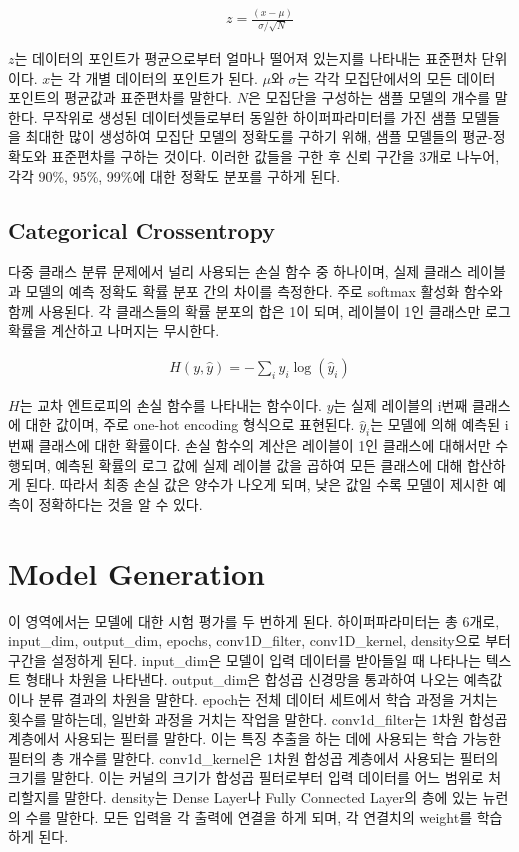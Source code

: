 \documentclass{jcse}
\begin{document}
\begin{eqnarray}
z = \frac{(x - \mu)}{\sigma / \sqrt{N}}
\end{eqnarray}

${z}$는 데이터의 포인트가 평균으로부터 얼마나 떨어져 있는지를 나타내는 표준편차 단위이다.
${x}$는 각 개별 데이터의 포인트가 된다.
$\mu$와 $\sigma$는 각각 모집단에서의 모든 데이터 포인트의 평균값과 표준편차를 말한다.
${N}$은 모집단을 구성하는 샘플 모델의 개수를 말한다.
무작위로 생성된 데이터셋들로부터 동일한 하이퍼파라미터를 가진 샘플 모델들을 최대한 많이 생성하여 모집단 모델의 정확도를 구하기 위해, 샘플 모델들의 평균-정확도와 표준편차를 구하는 것이다. 이러한 값들을 구한 후 신뢰 구간을 3개로 나누어, 각각 90\%, 95\%, 99\%에 대한 정확도 분포를 구하게 된다.

\subsection{Categorical Crossentropy}
다중 클래스 분류 문제에서 널리 사용되는 손실 함수\cite{cite:CategoricalCrossentropy} 중 하나이며, 실제 클래스 레이블과 모델의 예측 정확도 확률 분포 간의 차이를 측정한다. 주로 softmax 활성화 함수\cite{cite:softmax}와 함께 사용된다. 각 클래스들의 확률 분포의 합은 1이 되며, 레이블이 1인 클래스만 로그 확률을 계산하고 나머지는 무시한다.

\begin{eqnarray}
H(y, \hat{y}) = -\sum_{i} y_i \log(\hat{y}_i)
\end{eqnarray}

${H}$는 교차 엔트로피의 손실 함수를 나타내는 함수이다.
${y}$는 실제 레이블의 i번째 클래스에 대한 값이며, 주로 one-hot encoding 형식으로 표현된다.
$\hat{y}_i$는 모델에 의해 예측된 i번째 클래스에 대한 확률이다.
손실 함수의 계산은 레이블이 1인 클래스에 대해서만 수행되며, 예측된 확률의 로그 값에 실제 레이블 값을 곱하여 모든 클래스에 대해 합산하게 된다. 따라서 최종 손실 값은 양수가 나오게 되며, 낮은 값일 수록 모델이 제시한 예측이 정확하다는 것을 알 수 있다.

\section{Model Generation}

이 영역에서는 모델에 대한 시험 평가를 두 번하게 된다.
하이퍼파라미터는 총 6개로, input\_dim, output\_dim, epochs, conv1D\_filter, conv1D\_kernel, density으로 부터 구간을 설정하게 된다.
input\_dim은 모델이 입력 데이터를 받아들일 때 나타나는 텍스트 형태나 차원을 나타낸다.
output\_dim은 합성곱 신경망을 통과하여 나오는 예측값이나 분류 결과의 차원을 말한다.
epoch는 전체 데이터 세트에서 학습 과정을 거치는 횟수를 말하는데, 일반화 과정을 거치는 작업을 말한다.
conv1d\_filter는 1차원 합성곱 계층에서 사용되는 필터를 말한다. 이는 특징 추출\cite{cite:Convoultional}을 하는 데에 사용되는 학습 가능한 필터의 총 개수를 말한다.
conv1d\_kernel은 1차원 합성곱 계층에서 사용되는 필터의 크기를 말한다. 이는 커널의 크기가 합성곱 필터로부터 입력 데이터를 어느 범위로 처리할지를 말한다.
density는 Dense Layer나 Fully Connected Layer의 층에 있는 뉴런의 수를 말한다. 모든 입력을 각 출력에 연결을 하게 되며, 각 연결치의 weight를 학습하게 된다.
\\
\end{document}
